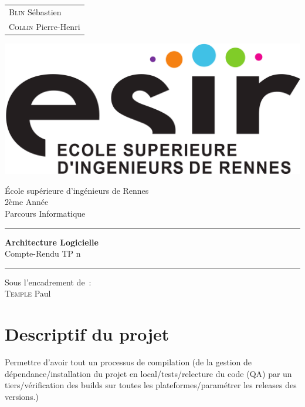 \documentclass{article}
\begin{document}
\begin{titlepage}
	\vspace{-20px}
	\begin{tabular}{l}
		\textsc{Blin} Sébastien\\
		\textsc{Collin} Pierre-Henri
	\end{tabular}
	\hfill \vspace{10px}\includegraphics[scale=0.1]{../../../esir.png}\\
	\vfill
	\begin{center}
		\Huge{École supérieure d'ingénieurs de Rennes}\\
		\vspace{1cm}
		\LARGE{2ème Année}\\
		\large{Parcours Informatique}\\
		\vspace{0.5cm}\hrule\vspace{0.5cm}
		\LARGE{\textbf{Architecture Logicielle}}\\
		\Large{Compte-Rendu TP n}
		\vspace{0.5cm}\hrule
		\vfill
		\vfill
	\end{center}
	\begin{flushleft}
		\Large{Sous l'encadrement de~:}\\
		\vspace{0.2cm}
		\large{\textsc{Temple} Paul}
	\end{flushleft}
	\vfill
\end{titlepage}

\section{Descriptif du projet}
Permettre d'avoir tout un processus de compilation (de la gestion de dépendance/installation du projet en local/tests/relecture du code (QA) par un tiers/vérification des builds sur toutes les plateformes/paramétrer les releases des versions.)
\end{document}
